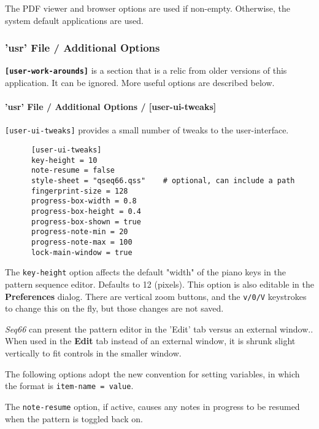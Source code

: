    The PDF viewer and browser options are used if non-empty.
   Otherwise, the system default applications are used.

\subsubsection{'usr' File / Additional Options}
\label{subsubsec:usr_file_added_options}

   \textbf{\texttt{[user-work-arounds]}} is a section that is a relic from
   older versions of this application.  It can be ignored.  More useful options
   are described below.

\paragraph{'usr' File / Additional Options / [user-ui-tweaks]}
\label{paragraph:user_file_added_options_tweaks}

   \texttt{[user-ui-tweaks]} provides a small number of tweaks to the
   user-interface.

   \begin{verbatim}
      [user-ui-tweaks]
      key-height = 10
      note-resume = false
      style-sheet = "qseq66.qss"    # optional, can include a path
      fingerprint-size = 128
      progress-box-width = 0.8
      progress-box-height = 0.4
      progress-box-shown = true
      progress-note-min = 20
      progress-note-max = 100
      lock-main-window = true
   \end{verbatim}

   The \texttt{key-height} option
   affects the default "width" of the piano keys in the pattern
   sequence editor.  Defaults to 12 (pixels).
   This option is also editable in the \textbf{Preferences} dialog.
   There are vertical zoom buttons, and the \texttt{v/0/V} keystrokes to change
   this on the fly, but those changes are not saved.

   \textsl{Seq66} can present the pattern editor in the 'Edit' tab
   versus an external window..
   When used in the \textbf{Edit} tab instead of an external window,
   it is shrunk slight vertically to fit controls in the smaller window.

   The following options adopt the new convention for setting variables, in
   which the format is \texttt{item-name = value}.

   The \texttt{note-resume} option, if active, causes any notes in progress
   to be resumed when the pattern is toggled back on.

